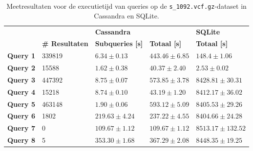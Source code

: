 \begin{table}[h]
\centering
\begin{tabular}{@{}lllll@{}}
\cmidrule(l){3-5}
                              &         & \multicolumn{2}{|l|}{\textbf{Cassandra}}                                                      & \multicolumn{1}{l|}{\textbf{SQLite}}                             \\ 
\cmidrule(l){2-5}
\multicolumn{1}{l|}{}  & \multicolumn{1}{l|}{\textbf{\# Resultaten}}               & \multicolumn{1}{l|}{\textbf{Subqueries [s]}} & \multicolumn{1}{l|}{\textbf{Totaal [s]}} & \multicolumn{1}{l|}{\textbf{Totaal [s]}} \\ \midrule
\multicolumn{1}{|l|}{\textbf{Query 1}} & \multicolumn{1}{l|}{339819} & \multicolumn{1}{l|}{$6.34 \pm 0.13$}             & \multicolumn{1}{l|}{$443.46 \pm 6.85$}          & \multicolumn{1}{l|}{$148.4 \pm 1.06$}                          \\
\multicolumn{1}{|l|}{\textbf{Query 2}} & \multicolumn{1}{l|}{15588} & \multicolumn{1}{l|}{$1.62 \pm 0.38$}             & \multicolumn{1}{l|}{$40.37 \pm 2.40$}          & \multicolumn{1}{l|}{$2.53 \pm 0.02$}                          \\
\multicolumn{1}{|l|}{\textbf{Query 3}} & \multicolumn{1}{l|}{447392} &\multicolumn{1}{l|}{$8.75 \pm 0.07$}            & \multicolumn{1}{l|}{$573.85 \pm 3.78$}          & \multicolumn{1}{l|}{$8428.81 \pm 30.31$}                        \\
\multicolumn{1}{|l|}{\textbf{Query 4}} & \multicolumn{1}{l|}{15218} &\multicolumn{1}{l|}{$8.74 \pm 0.10$}            & \multicolumn{1}{l|}{$43.19 \pm 1.20$}            & \multicolumn{1}{l|}{$8412.17 \pm 36.02$}                        \\
\multicolumn{1}{|l|}{\textbf{Query 5}} & \multicolumn{1}{l|}{463148} &\multicolumn{1}{l|}{$1.90 \pm 0.06$}            & \multicolumn{1}{l|}{$593.12 \pm 5.09$}           & \multicolumn{1}{l|}{$8405.53 \pm 29.26$}                        \\
\multicolumn{1}{|l|}{\textbf{Query 6}} & \multicolumn{1}{l|}{1802} &\multicolumn{1}{l|}{$219.63 \pm 4.24$}                 & \multicolumn{1}{l|}{$237.22 \pm 4.55$}                    & \multicolumn{1}{l|}{$8404.66 \pm 24.28$}                        \\
\multicolumn{1}{|l|}{\textbf{Query 7}} & \multicolumn{1}{l|}{0} &\multicolumn{1}{l|}{$109.67 \pm 1.12$}          & \multicolumn{1}{l|}{$109.67 \pm 1.12$}           & \multicolumn{1}{l|}{$8513.17 \pm 132.52$}                        \\
\multicolumn{1}{|l|}{\textbf{Query 8}} & \multicolumn{1}{l|}{5} &\multicolumn{1}{l|}{$353.30 \pm 1.68$} & \multicolumn{1}{l|}{$367.29 \pm 2.08$}       & \multicolumn{1}{l|}{$8448.35 \pm 19.25$}                                \\ 
\bottomrule
\end{tabular}
\caption{Meetresultaten voor de executietijd van queries op de \texttt{s\_1092.vcf.gz}-dataset in Cassandra en SQLite.}
\end{table}

